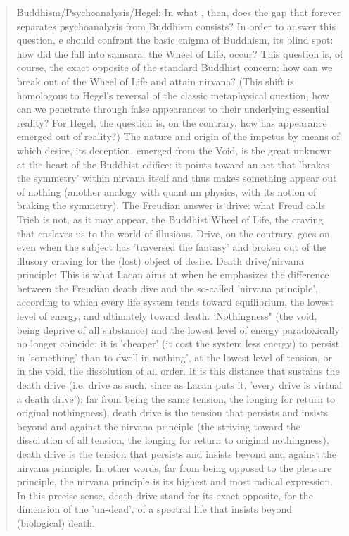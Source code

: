 \documentclass[10pt]{book}
\begin{document}
\begin{quotation}
Buddhism/Psychoanalysis/Hegel: In what , then, does the gap that forever separates psychoanalysis from Buddhism consists? In order to answer this question, e should confront the basic enigma of Buddhism, its blind spot: how did the fall into samsara, the Wheel of Life, occur? This question is, of course, the exact opposite of the standard Buddhist concern: how can we break out of the Wheel of Life and attain nirvana? (This shift is homologous to Hegel's reversal of the classic metaphysical question, how can we penetrate through false appearances to their underlying essential reality? For Hegel, the question is, on the contrary, how has appearance emerged out of reality?) The nature and origin of the impetus by means of which desire, its deception, emerged from the Void, is the great unknown at the heart of the Buddhist edifice: it points toward an act that 'brakes the symmetry' within nirvana itself and thus makes something appear out of nothing (another analogy with quantum physics, with its notion of braking the symmetry). The Freudian answer is drive: what Freud calls Trieb is not, as it may appear, the Buddhist Wheel of Life, the craving that enslaves us to the world of illusions. Drive, on the contrary, goes on even when the subject has 'traversed the fantasy' and broken out of the illusory craving for the (lost) object of desire.
Death drive/nirvana principle: This is what Lacan aims at when he emphasizes the difference between the Freudian death dive and the so-called 'nirvana principle', according to which every life system tends toward equilibrium, the lowest level of energy, and ultimately toward death. 'Nothingness" (the void, being deprive of all substance) and the lowest level of energy paradoxically no longer coincide; it is 'cheaper' (it cost the system less energy) to persist in 'something' than to dwell in nothing', at the lowest level of tension, or in the void, the dissolution of all order. It is this distance that sustains the death drive (i.e. drive as such, since as Lacan puts it, 'every drive is virtual a death drive'): far from being the same tension, the longing for return to original nothingness), death drive is the tension that persists and insists beyond and against the nirvana principle (the striving toward the  dissolution of all tension, the longing for return to original nothingness), death drive is the tension that persists and insists beyond and against the nirvana principle. In other words, far from being opposed to the pleasure principle, the nirvana principle is its highest and most radical expression. In this precise sense, death drive stand for its exact opposite, for the dimension of the 'un-dead', of a spectral life that insists beyond (biological) death.
\end{quotation}
\end{document}
